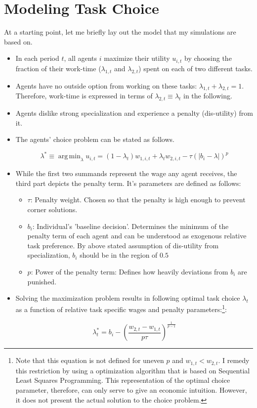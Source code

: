 \documentclass{article}
\DeclareMathOperator*{\argmin}{arg\,min}						%
\begin{document}
\section{Modeling Task Choice}
	At a starting point, let me briefly lay out the model that my simulations are based on.
	\begin{itemize}
		\item{In each period $t$, all agents $i$ maximize their utility $u_{i,t}$ by choosing the fraction of their work-time ($\lambda_{1,t}$ and $\lambda_{2,t}$) spent on each of two different tasks.}
		\item{Agents have no outside option from working on these tasks: $\lambda_{1,t} + \lambda_{2,t}=1$. Therefore, work-time is expressed in terms of $\lambda_{2,t} \equiv \lambda_t$ in the following.}
		\item{Agents dislike strong specialization and experience a penalty (dis-utility) from it.}
		\item{The agents' choice problem can be stated as follows.}

		\begin{equation} \label{eq:utility}
		\lambda^* \equiv \argmin_\lambda u_{i,t} = (1-\lambda_t) w_{1, i, t} + \lambda_t w_{2, i, t} - \tau (|b_i - \lambda|)^p
		\end{equation}

		\item{While the first two summands represent the wage any agent receives, the third part depicts the penalty term. It's parameters are defined as follows:}
			\begin{itemize}
				\item{$\tau$: Penalty weight. Chosen so that the penalty is high enough to prevent corner solutions.}
				\item{$b_i$: Individual's 'baseline decision'. Determines the minimum of the penalty term of each agent and can be understood as exogenous relative task preference. By above stated assumption of dis-utility from specialization, $b_i$ should be in the region of $0.5$}
				\item{$p$: Power of the penalty term: Defines how heavily deviations from $b_i$ are punished.}	
			\end{itemize}

		\item{Solving the maximization problem results in following optimal task choice $\lambda_t$ as a function of relative task specific wages and penalty parameters:\footnote{Note that this equation is not defined for uneven $p$ and $w_{1,t} < w_{2,t}$. I remedy this restriction by using a optimization algorithm that is based on Sequential Least Squares Programming. This representation of the optimal choice parameter, therefore, can only serve to give an economic intuition. However, it does not present the actual solution to the choice problem.}:}

		\begin{equation} \label{eq:lmb_opt}
		\lambda^*_t = b_i - (\frac{w_{2, t} - w_{1, t}}{p \tau})^{\frac{1}{p-1}}
		\end{equation}
	\end{itemize}
\end{document}
